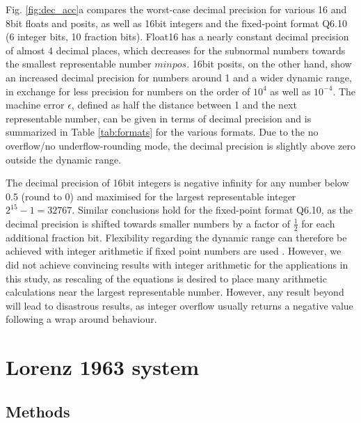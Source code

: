 \documentclass[draft]{agujournal2019}
\begin{document}
Fig. \ref{fig:dec_acc}a compares the worst-case decimal precision for various 16 and 8bit floats and posits, as well as 16bit integers and the fixed-point format Q6.10 (6 integer bits, 10 fraction bits). Float16 has a nearly constant decimal precision of almost 4 decimal places, which decreases for the subnormal numbers towards the smallest representable number $minpos$. 16bit posits, on the other hand, show an increased decimal precision for numbers around 1 and a wider dynamic range, in exchange for less precision for numbers on the order of $10^4$ as well as $10^{-4}$.  The machine error $\epsilon$, defined as half the distance between 1 and the next representable number, can be given in terms of decimal precision and is summarized in Table \ref{tab:formats} for the various formats. Due to the no overflow/no underflow-rounding mode, the decimal precision is slightly above zero outside the dynamic range. 

The decimal precision of 16bit integers is negative infinity for any number below 0.5 (round to 0) and maximised for the largest representable integer $2^{15} - 1 =  32767$. Similar conclusions hold for the fixed-point format Q6.10, as the decimal precision is shifted towards smaller numbers by a factor of $\tfrac{1}{2}$ for each additional fraction bit. Flexibility regarding the dynamic range can therefore be achieved with integer arithmetic if fixed point numbers are used \cite{Russell2017}. However, we did not achieve convincing results with integer arithmetic for the applications in this study, as rescaling of the equations is desired to place many arithmetic calculations near the largest representable number. However, any result beyond will lead to disastrous results, as integer overflow usually returns a negative value following a wrap around behaviour. 


\section{Lorenz 1963 system}
\label{sec:L63}

\subsection{Methods}
\label{sec:L63_methods}
\end{document}
